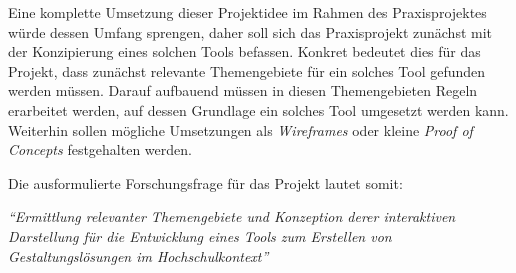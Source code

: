 Eine komplette Umsetzung dieser Projektidee im Rahmen des Praxisprojektes würde dessen Umfang sprengen, daher soll sich das Praxisprojekt zunächst mit der Konzipierung eines solchen Tools befassen. Konkret bedeutet dies für das Projekt, dass zunächst relevante Themengebiete für ein solches Tool gefunden werden müssen. Darauf aufbauend müssen in diesen Themengebieten Regeln erarbeitet werden, auf dessen Grundlage ein solches Tool umgesetzt werden kann. Weiterhin sollen mögliche Umsetzungen als \textit{Wireframes} oder kleine \textit{Proof of Concepts} festgehalten werden.

Die ausformulierte Forschungsfrage für das Projekt lautet somit:

\textit{“Ermittlung relevanter Themengebiete und Konzeption derer interaktiven Darstellung für die Entwicklung eines Tools zum Erstellen von Gestaltungslösungen im Hochschulkontext”}



\clearpage
